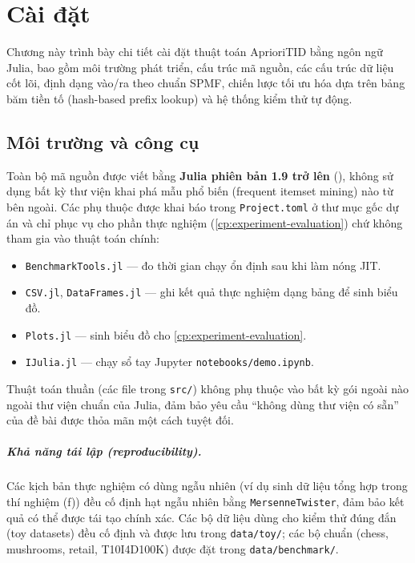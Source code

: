 \chapter[Cài đặt]{Cài đặt}
\label{cp:implementation}

Chương này trình bày chi tiết cài đặt thuật toán AprioriTID bằng ngôn ngữ Julia, bao gồm môi trường phát triển, cấu trúc mã nguồn, các cấu trúc dữ liệu cốt lõi, định dạng vào/ra theo chuẩn SPMF, chiến lược tối ưu hóa dựa trên bảng băm tiền tố (hash-based prefix lookup) và hệ thống kiểm thử tự động.

\section{Môi trường và công cụ}
\label{sec:impl-env}

Toàn bộ mã nguồn được viết bằng \textbf{Julia phiên bản 1.9 trở lên} (\cite{Bezanson2017Julia}), không sử dụng bất kỳ thư viện khai phá mẫu phổ biến (frequent itemset mining) nào từ bên ngoài. Các phụ thuộc được khai báo trong \texttt{Project.toml} ở thư mục gốc dự án và chỉ phục vụ cho phần thực nghiệm (\autoref{cp:experiment-evaluation}) chứ không tham gia vào thuật toán chính:

\begin{itemize}
    \item \texttt{BenchmarkTools.jl} --- đo thời gian chạy ổn định sau khi làm nóng JIT.
    \item \texttt{CSV.jl}, \texttt{DataFrames.jl} --- ghi kết quả thực nghiệm dạng bảng để sinh biểu đồ.
    \item \texttt{Plots.jl} --- sinh biểu đồ cho \autoref{cp:experiment-evaluation}.
    \item \texttt{IJulia.jl} --- chạy sổ tay Jupyter \texttt{notebooks/demo.ipynb}.
\end{itemize}

Thuật toán thuần (các file trong \texttt{src/}) không phụ thuộc vào bất kỳ gói ngoài nào ngoài thư viện chuẩn của Julia, đảm bảo yêu cầu ``không dùng thư viện có sẵn'' của đề bài được thỏa mãn một cách tuyệt đối.

\paragraph{Khả năng tái lập (reproducibility).} Các kịch bản thực nghiệm có dùng ngẫu nhiên (ví dụ sinh dữ liệu tổng hợp trong thí nghiệm (f)) đều cố định hạt ngẫu nhiên bằng \texttt{MersenneTwister}, đảm bảo kết quả có thể được tái tạo chính xác. Các bộ dữ liệu dùng cho kiểm thử đúng đắn (toy datasets) đều cố định và được lưu trong \texttt{data/toy/}; các bộ chuẩn (chess, mushrooms, retail, T10I4D100K) được đặt trong \texttt{data/benchmark/}.


